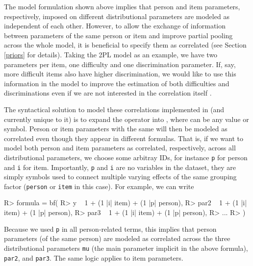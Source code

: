 \documentclass[
]{jss}
\begin{document}
The model formulation shown above implies that person and item
parameters, respectively, imposed on different distributional parameters
are modeled as independent of each other. However, to allow the exchange
of information between parameters of the same person or item and improve
partial pooling across the whole model, it is beneficial to specify them
as correlated (see Section \ref{priors} for details). Taking the 2PL
model as an example, we have two parameters per item, one difficulty and
one discrimination parameter. If, say, more difficult items also have
higher discrimination, we would like to use this information in the
model to improve the estimation of both difficulties and discriminations
even if we are not interested in the correlation itself \citep[e.g.,
see][ for a general discussion of correlations between varying
coefficients in multilevel models]{gelmanMLM2006}.

The syntactical solution to model these correlations implemented in
 (and currently unique to it) is to expand the \code{|}
operator into , where  can be any value or
symbol. Person or item parameters with the same  will then be
modeled as correlated even though they appear in different 
formulas. That is, if we want to model both person and item parameters
as correlated, respectively, across all distributional parameters, we
choose some arbitray IDs, for instance \texttt{p} for person and
\texttt{i} for item. Importantly, \texttt{p} and \texttt{i} are no
variables in the dataset, they are simply symbols used to connect
multiple varying effects of the same grouping factor (\texttt{person} or
\texttt{item} in this case). For example, we can write

\begin{CodeChunk}

\begin{CodeInput}
R> formula = bf(
R>   y ~ 1 + (1 |i| item) + (1 |p| person),
R>   par2 ~ 1 + (1 |i| item) + (1 |p| person),
R>   par3 ~ 1 + (1 |i| item) + (1 |p| person),
R>   ...
R> )
\end{CodeInput}
\end{CodeChunk}

Because we used \texttt{\textbar{}p\textbar{}} in all person-related
terms, this implies that person parameters (of the same person) are
modeled as correlated across the three distributional parameters
\texttt{mu} (the main parameter implicit in the above formula),
\texttt{par2}, and \texttt{par3}. The same logic applies to item
parameters.
\end{document}
